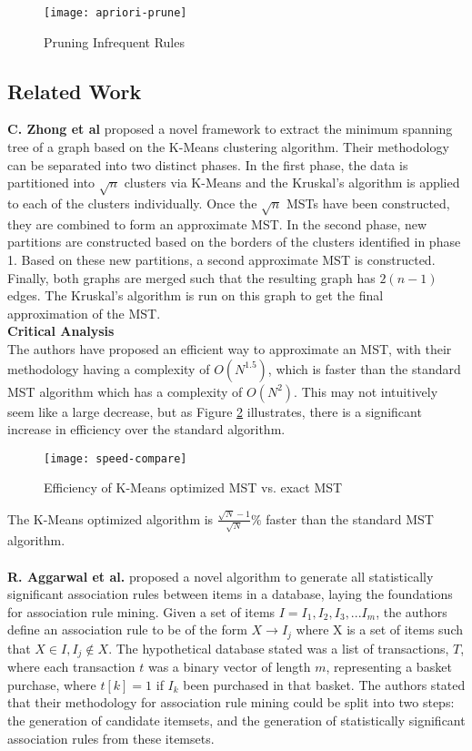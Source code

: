 \documentclass[a4paper,11pt]{article}
\begin{document}
\begin{figure}[H]\centering
\texttt{[image: apriori-prune]}
\caption{Pruning Infrequent Rules}
\label{fig:prune}
\end{figure}

\subsection{Related Work}
\label{related-work}
\textbf{C. Zhong et al} \cite{kmeans_mst} proposed a novel framework to extract the minimum spanning tree of a graph based on the K-Means clustering algorithm. Their methodology can be separated into two distinct phases. In the first phase,  the data is partitioned into $\sqrt{n}$ clusters via K-Means and the Kruskal's algorithm is applied to each of the clusters individually.  Once the $\sqrt{n}$ MSTs have been constructed, they are combined to form an approximate MST. In the second phase,  new partitions are constructed based on the borders of the clusters identified in phase 1.  Based on these new partitions, a second approximate MST is constructed.  Finally, both graphs are merged such that the resulting graph has $2(n-1)$ edges. The Kruskal's algorithm is run on this graph to get the final approximation of the MST.
\\\textbf{Critical Analysis}\\
The authors have proposed an efficient way to approximate an MST, with their methodology having a complexity of $O(N^{1.5})$, which is faster than the standard MST algorithm which has a complexity of $O(N^2)$. This may not intuitively seem like a large decrease, but as Figure \ref{fig:speed-compare} illustrates, there is a significant increase in efficiency over the standard algorithm.
\begin{figure}[H]
\centering
\texttt{[image: speed-compare]}
\caption{Efficiency of K-Means optimized MST vs.  exact MST}\label{fig:speed-compare}
\end{figure}
\noindent  The K-Means optimized algorithm is $\frac{\sqrt{N}-1}{\sqrt{N}}\%$  faster than the standard MST algorithm.
\\\\
\textbf{R. Aggarwal et al.} \cite{mine} proposed a novel algorithm to generate all statistically significant association rules between items in a database, laying the foundations for association rule mining.  Given a set of items $I = I_1, I_2, I_3,...I_m$, the authors define an association rule to be of the form $X \rightarrow I_j$ where X is a set of items such that $X \in I, I_j \notin X$.  The hypothetical database stated was a list of transactions, $T$, where each transaction $t$ was a binary vector of length $m$, representing a basket purchase, where $t[k] = 1$ if $I_k$ been purchased in that basket.  The authors stated that their methodology for association rule mining could be split into two steps: the generation of candidate itemsets, and the generation of statistically significant association rules from these itemsets. \\
\end{document}
